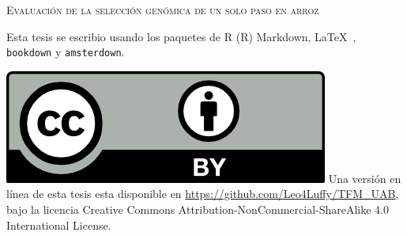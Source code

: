 \documentclass[11pt,spanish,a4paper,oneside,]{book} %
\begin{document}
\frontmatter
\thispagestyle{empty}
\def\drop{.1\textheight}

\vspace*{\drop}
\begin{center}
\Huge \textsc{Evaluación de la selección genómica de un solo paso en arroz}
\end{center}

\clearpage
\thispagestyle{empty}
\vspace*{\fill}
\begingroup %
\small
\setlength{\parskip}{\baselineskip} %
\setlength\parindent{0pt} %

Esta tesis se escribio usando los paquetes de R (R) Markdown, \LaTeX\ , \verb+bookdown+  y \verb+amsterdown+.

\vspace{\baselineskip}
\includegraphics{_bookdown_files/CC-BY.png} \newline
Una versión en línea de esta tesis esta disponible en 
\url{https://github.com/Leo4Luffy/TFM_UAB},
bajo la licencia Creative Commons Attribution-NonCommercial-ShareAlike 4.0 International License.
\endgroup
\end{document}

